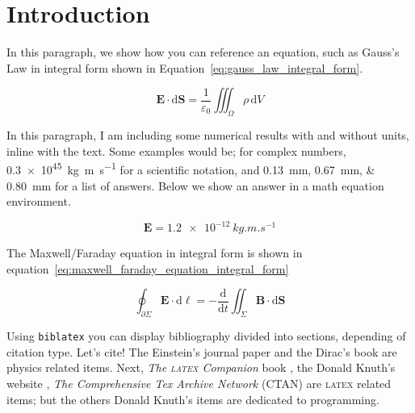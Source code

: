 \section{Introduction}\label{section:introduction}

\kant[1] 

In this paragraph, we show how you can reference an equation, such as Gauss's Law in integral form shown in Equation~\ref{eq:gauss_law_integral_form}. 

\begin{equation}
\label{eq:gauss_law_integral_form}
\mathbf{E} \cdot \mathrm{d}\mathbf{S} ={\frac{1}{\varepsilon_{0}}}\iiint_{\Omega}\rho\,\mathrm{d}V
\end{equation}

\kant[2] 

In this paragraph, I am including some numerical results with and without units, inline with the text. Some examples would be;  for complex numbers,
\num{.3e45}~\unit{\kilogram\metre\per\second} for a scientific notation, and 
\qtylist{0.13;0.67;0.80}{\milli\metre} for a list of answers. Below we show an answer in a math equation environment.

\begin{equation}
\label{eq:numbers_and_units}
\mathbf{E} = \num{1.2e-12}\ \unit{kg.m.s^{-1}}
\end{equation}


The Maxwell/Faraday equation in integral form is shown in equation~\ref{eq:maxwell_faraday_equation_integral_form}

\begin{equation}
\label{eq:maxwell_faraday_equation_integral_form}
\oint_{\partial\Sigma} \mathbf{E} \cdot \mathrm{d}{\mathbf{\ell}}=-{\frac {\mathrm{d}}{\mathrm{d}t}} \iint_{\Sigma}\mathbf{B}\cdot\mathrm{d}\mathbf{S} 
\end{equation}

Using \texttt{biblatex} you can display bibliography divided into sections,  depending of citation type. Let's cite! The Einstein's journal paper \cite{einstein} and the Dirac's book \cite{dirac} are physics related items. Next, \textit{The \textsc{latex} Companion} book \cite{latexcompanion}, the Donald Knuth's website \cite{knuthwebsite}, \textit{The Comprehensive Tex Archive Network} (CTAN) \cite{ctan} are \textsc{latex} related items; but the others Donald Knuth's items \cite{knuth-fa,knuth-acp} are dedicated to programming. 


